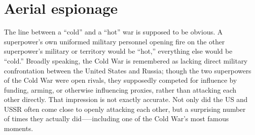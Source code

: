 \documentclass[14pt]{extarticle}
\begin{document}


\section{Aerial espionage}
The line between a \enquote{cold} and a \enquote{hot} war is supposed to be obvious. A superpower's own uniformed military personnel opening fire on the other superpower's military or territory would be \enquote{hot,} everything else would be \enquote{cold.} Broadly speaking, the Cold War is remembered as lacking direct military confrontation between the United States and Russia; though the two superpowers of the Cold War were open rivals, they supposedly competed for influence by funding, arming, or otherwise influencing proxies, rather than attacking each other directly. That impression is not exactly accurate. Not only did the US and USSR often come close to openly attacking each other, but a surprising number of times they actually did—--including one of the Cold War's most famous moments.

\end{document}

